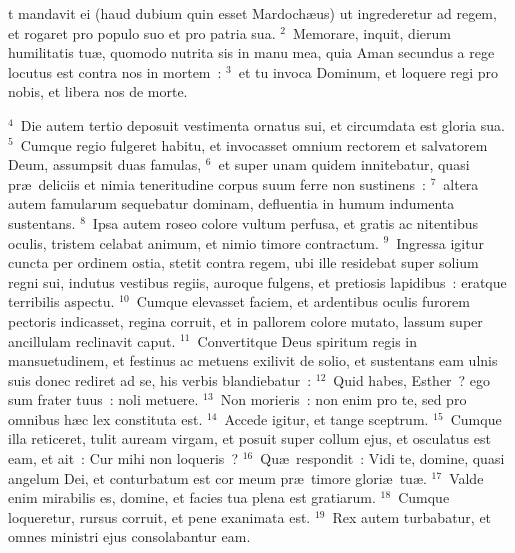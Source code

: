 \bchapter
{}t mandavit ei (haud dubium quin esset Mardoch\ae us) ut ingrederetur ad regem, et rogaret pro populo suo et pro patria sua.
${}^{2}$~Memorare, inquit, dierum humilitatis tu\ae , quomodo nutrita sis in manu mea, quia Aman secundus a rege locutus est contra nos in mortem~:
${}^{3}$~et tu invoca Dominum, et loquere regi pro nobis, et libera nos de morte.


${}^{4}$~Die autem tertio deposuit vestimenta ornatus sui, et circumdata est gloria sua.
${}^{5}$~Cumque regio fulgeret habitu, et invocasset omnium rectorem et salvatorem Deum, assumpsit duas famulas,
${}^{6}$~et super unam quidem innitebatur, quasi pr\ae\ deliciis et nimia teneritudine corpus suum ferre non sustinens~:
${}^{7}$~altera autem famularum sequebatur dominam, defluentia in humum indumenta sustentans.
${}^{8}$~Ipsa autem roseo colore vultum perfusa, et gratis ac nitentibus oculis, tristem celabat animum, et nimio timore contractum.
${}^{9}$~Ingressa igitur cuncta per ordinem ostia, stetit contra regem, ubi ille residebat super solium regni sui, indutus vestibus regiis, auroque fulgens, et pretiosis lapidibus~: eratque terribilis aspectu.
${}^{10}$~Cumque elevasset faciem, et ardentibus oculis furorem pectoris indicasset, regina corruit, et in pallorem colore mutato, lassum super ancillulam reclinavit caput.
${}^{11}$~Convertitque Deus spiritum regis in mansuetudinem, et festinus ac metuens exilivit de solio, et sustentans eam ulnis suis donec rediret ad se, his verbis blandiebatur~:
${}^{12}$~Quid habes, Esther~? ego sum frater tuus~: noli metuere.
${}^{13}$~Non morieris~: non enim pro te, sed pro omnibus h\ae c lex constituta est.
${}^{14}$~Accede igitur, et tange sceptrum.
${}^{15}$~Cumque illa reticeret, tulit auream virgam, et posuit super collum ejus, et osculatus est eam, et ait~: Cur mihi non loqueris~?
${}^{16}$~Qu\ae\ respondit~: Vidi te, domine, quasi angelum Dei, et conturbatum est cor meum pr\ae\ timore glori\ae\ tu\ae .
${}^{17}$~Valde enim mirabilis es, domine, et facies tua plena est gratiarum.
${}^{18}$~Cumque loqueretur, rursus corruit, et pene exanimata est.
${}^{19}$~Rex autem turbabatur, et omnes ministri ejus consolabantur eam.

